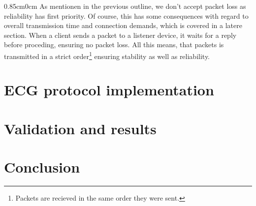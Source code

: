\documentclass{article}
\newcommand{\tWidth}{0.85cm}
\begin{document}
\begin{adjustwidth}{\tWidth}{0cm}
		As mentionen in the previous outline, we don't accept packet loss as reliability has first priority. Of course, this has some consequences with regard to overall transmission time and connection demands, which is covered in a latere section. When a client sends a packet to a listener device, it waits for a reply before proceding, ensuring no packet loss. All this means, that packets is transmitted in a strict order\footnote{Packets are recieved in the same order they were sent.} ensuring stability as well as reliability.\\
		
	\end{adjustwidth}
	
	\section{ECG protocol implementation}
	\section{Validation and results}
	\section{Conclusion}
	
	\pagebreak
	
	
	
	
	
		
\end{document}
